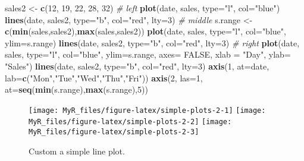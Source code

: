 \documentclass[]{book}
\newenvironment{Shaded}{}{}
\newcommand{\CommentTok}[1]{\textcolor[rgb]{0.38,0.63,0.69}{\textit{#1}}}
\newcommand{\DataTypeTok}[1]{\textcolor[rgb]{0.56,0.13,0.00}{#1}}
\newcommand{\DecValTok}[1]{\textcolor[rgb]{0.25,0.63,0.44}{#1}}
\newcommand{\KeywordTok}[1]{\textcolor[rgb]{0.00,0.44,0.13}{\textbf{#1}}}
\newcommand{\NormalTok}[1]{#1}
\newcommand{\OtherTok}[1]{\textcolor[rgb]{0.00,0.44,0.13}{#1}}
\newcommand{\StringTok}[1]{\textcolor[rgb]{0.25,0.44,0.63}{#1}}
\theoremstyle{definition}
\theoremstyle{definition}
\theoremstyle{definition}
\theoremstyle{remark}
\begin{document}
\begin{Shaded}
\begin{Highlighting}[]
\NormalTok{sales2 <-}\StringTok{ }\KeywordTok{c}\NormalTok{(}\DecValTok{12}\NormalTok{, }\DecValTok{19}\NormalTok{, }\DecValTok{22}\NormalTok{, }\DecValTok{28}\NormalTok{, }\DecValTok{32}\NormalTok{) }
\CommentTok{# left}
\KeywordTok{plot}\NormalTok{(date, sales, }\DataTypeTok{type=}\StringTok{"l"}\NormalTok{, }\DataTypeTok{col=}\StringTok{"blue"}\NormalTok{)}
\KeywordTok{lines}\NormalTok{(date, sales2, }\DataTypeTok{type=}\StringTok{"b"}\NormalTok{, }\DataTypeTok{col=}\StringTok{"red"}\NormalTok{, }\DataTypeTok{lty=}\DecValTok{3}\NormalTok{)}
\CommentTok{# middle}
\NormalTok{s.range <-}\StringTok{ }\KeywordTok{c}\NormalTok{(}\KeywordTok{min}\NormalTok{(sales,sales2),}\KeywordTok{max}\NormalTok{(sales,sales2))}
\KeywordTok{plot}\NormalTok{(date, sales, }\DataTypeTok{type=}\StringTok{"l"}\NormalTok{, }\DataTypeTok{col=}\StringTok{"blue"}\NormalTok{, }\DataTypeTok{ylim=}\NormalTok{s.range)}
\KeywordTok{lines}\NormalTok{(date, sales2, }\DataTypeTok{type=}\StringTok{"b"}\NormalTok{, }\DataTypeTok{col=}\StringTok{"red"}\NormalTok{, }\DataTypeTok{lty=}\DecValTok{3}\NormalTok{)}
\CommentTok{# right}
\KeywordTok{plot}\NormalTok{(date, sales, }\DataTypeTok{type=}\StringTok{"l"}\NormalTok{, }\DataTypeTok{col=}\StringTok{"blue"}\NormalTok{,}
     \DataTypeTok{ylim=}\NormalTok{s.range,}
     \DataTypeTok{axes=} \OtherTok{FALSE}\NormalTok{, }
     \DataTypeTok{xlab =} \StringTok{"Day"}\NormalTok{,}
     \DataTypeTok{ylab=} \StringTok{"Sales"}\NormalTok{)}
\KeywordTok{lines}\NormalTok{(date, sales2, }\DataTypeTok{type=}\StringTok{"b"}\NormalTok{, }\DataTypeTok{col=}\StringTok{"red"}\NormalTok{, }\DataTypeTok{lty=}\DecValTok{3}\NormalTok{)}
\KeywordTok{axis}\NormalTok{(}\DecValTok{1}\NormalTok{, }\DataTypeTok{at=}\NormalTok{date, }\DataTypeTok{lab=}\KeywordTok{c}\NormalTok{(}\StringTok{"Mon"}\NormalTok{,}\StringTok{"Tue"}\NormalTok{,}\StringTok{"Wed"}\NormalTok{,}\StringTok{"Thu"}\NormalTok{,}\StringTok{"Fri"}\NormalTok{))}
\KeywordTok{axis}\NormalTok{(}\DecValTok{2}\NormalTok{, }\DataTypeTok{las=}\DecValTok{1}\NormalTok{, }\DataTypeTok{at=}\KeywordTok{seq}\NormalTok{(}\KeywordTok{min}\NormalTok{(s.range),}\KeywordTok{max}\NormalTok{(s.range),}\DecValTok{5}\NormalTok{)) }
\end{Highlighting}
\end{Shaded}

\begin{figure}

{\centering \texttt{[image: MyR\_files/figure-latex/simple-plots-2-1]} \texttt{[image: MyR\_files/figure-latex/simple-plots-2-2]} \texttt{[image: MyR\_files/figure-latex/simple-plots-2-3]} 

}

\caption{Custom a simple line plot.}\label{fig:simple-plots-2}
\end{figure}
\end{document}
